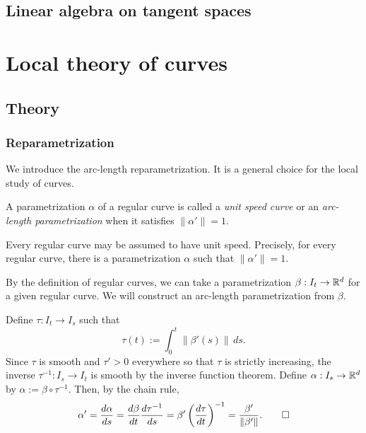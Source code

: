 \documentclass{../exp}
\def\a{\alpha}
\begin{document}
\subsection{Linear algebra on tangent spaces}











\section{Local theory of curves}

\subsection{Theory}

\subsubsection{Reparametrization}

We introduce the arc-length reparametrization.
It is a general choice for the local study of curves.
\begin{defn}
A parametrization $\a$ of a regular curve is called a \emph{unit speed curve} or an \emph{arc-length parametrization} when it satisfies $\|\a'\|=1$.
\end{defn}
\begin{thm}
Every regular curve may be assumed to have unit speed.
Precisely, for every regular curve, there is a parametrization $\a$ such that $\|\a'\|=1$.
\end{thm}
\begin{pf}
By the definition of regular curves, we can take a parametrization $\beta:I_t\to\R^d$ for a given regular curve.
We will construct an arc-length parametrization from $\beta$.

Define $\tau:I_t\to I_s$ such that
\[\tau(t):=\int_0^t\|\beta'(s)\|\,ds.\]
Since $\tau$ is smooth and $\tau'>0$ everywhere so that $\tau$ is strictly increasing, the inverse $\tau^{-1}:I_s\to I_t$ is smooth by the inverse function theorem.
Define $\a:I_s\to\R^d$ by $\a:=\beta\circ\tau^{-1}$.
Then, by the chain rule,
\[\a'=\dd{\a}{s}=\dd{\beta}{t}\dd{\tau^{-1}}{s}=\beta'\left(\dd{\tau}{t}\right)^{-1}=\frac{\beta'}{\|\beta'\|}.\qedhere\]
\end{pf}
\end{document}
